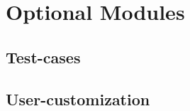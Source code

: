 \chapter{Optional Modules}\label{ChapOptionalModules}


\section{Test-cases}\label{ChapOptionalModulesSecTestcases}

\section{User-customization}\label{ChapOptionalSecModulesUserCust}

